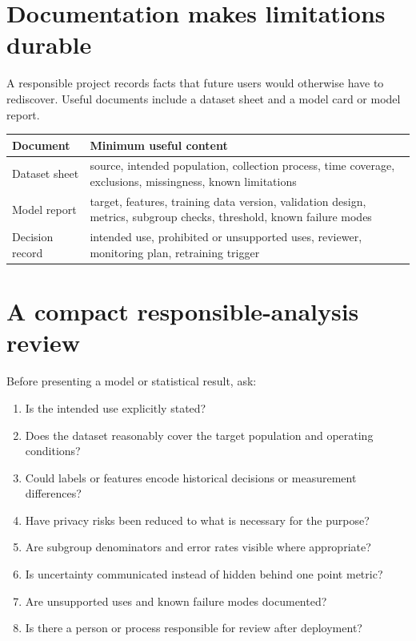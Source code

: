 \section{Documentation makes limitations durable}
A responsible project records facts that future users would otherwise have to rediscover. Useful documents include a dataset sheet and a model card or model report.

\begin{dstable}
\begin{tabularx}{\linewidth}{@{}D{3.0cm}Y@{}}
\toprule
{}
\textbf{Document} & \textbf{Minimum useful content} \\
\midrule
Dataset sheet & source, intended population, collection process, time coverage, exclusions, missingness, known limitations \\
Model report & target, features, training data version, validation design, metrics, subgroup checks, threshold, known failure modes \\
Decision record & intended use, prohibited or unsupported uses, reviewer, monitoring plan, retraining trigger \\
\bottomrule
\end{tabularx}
\end{dstable}

\section{A compact responsible-analysis review}
Before presenting a model or statistical result, ask:
\begin{enumerate}
  \item Is the intended use explicitly stated?
  \item Does the dataset reasonably cover the target population and operating conditions?
  \item Could labels or features encode historical decisions or measurement differences?
  \item Have privacy risks been reduced to what is necessary for the purpose?
  \item Are subgroup denominators and error rates visible where appropriate?
  \item Is uncertainty communicated instead of hidden behind one point metric?
  \item Are unsupported uses and known failure modes documented?
  \item Is there a person or process responsible for review after deployment?
\end{enumerate}

